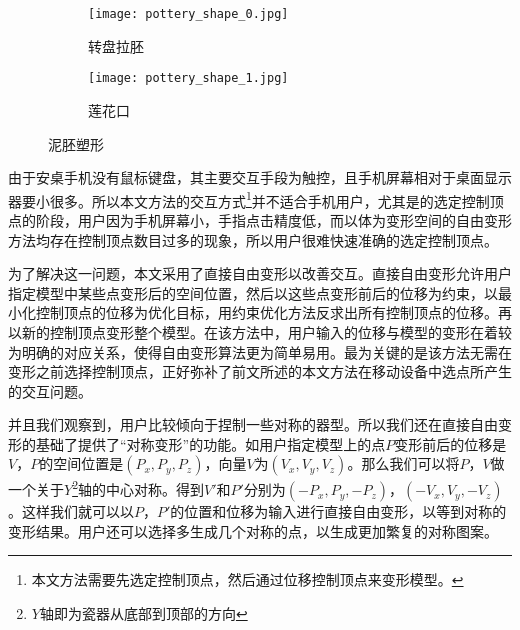 \begin{figure}[htbp]
	\centering
	\begin{subfigure}[b]{.4\textwidth}
		\centering
		\texttt{[image: pottery\_shape\_0.jpg]}
		\caption{转盘拉胚}\label{subfig:pottery_shape_0}
	\end{subfigure}
	\begin{subfigure}[b]{.4\textwidth}
		\centering
		\texttt{[image: pottery\_shape\_1.jpg]}
		\caption{莲花口}\label{subfig:pottery_shape_1}
	\end{subfigure}
	\caption{泥胚塑形}\label{fig:pottery_shape}
\end{figure}

由于安桌手机没有鼠标键盘，其主要交互手段为触控，且手机屏幕相对于桌面显示器要小很多。所以本文方法的交互方式\footnote{本文方法需要先选定控制顶点，然后通过位移控制顶点来变形模型。}并不适合手机用户，尤其是的选定控制顶点的阶段，用户因为手机屏幕小，手指点击精度低，而以体为变形空间的自由变形方法均存在控制顶点数目过多的现象，所以用户很难快速准确的选定控制顶点。

为了解决这一问题，本文采用了直接自由变形\cite{hsu1992}以改善交互。直接自由变形允许用户指定模型中某些点变形后的空间位置，然后以这些点变形前后的位移为约束，以最小化控制顶点的位移为优化目标，用约束优化方法反求出所有控制顶点的位移。再以新的控制顶点变形整个模型。在该方法中，用户输入的位移与模型的变形在着较为明确的对应关系，使得自由变形算法更为简单易用。最为关键的是该方法无需在变形之前选择控制顶点，正好弥补了前文所述的本文方法在移动设备中选点所产生的交互问题。

并且我们观察到，用户比较倾向于捏制一些对称的器型。所以我们还在直接自由变形的基础了提供了“对称变形”的功能。如用户指定模型上的点$P$变形前后的位移是$V$，$P$的空间位置是$(P_x, P_y, P_z)$，向量$V$为$(V_x, V_y, V_z)$。那么我们可以将$P$，$V$做一个关于$Y$\footnote{$Y$轴即为瓷器从底部到顶部的方向}轴的中心对称。得到$V'$和$P'$分别为$(-P_x, P_y, -P_z)$，$(-V_x, V_y, -V_z)$。这样我们就可以以$P$，$P'$的位置和位移为输入进行直接自由变形，以等到对称的变形结果。用户还可以选择多生成几个对称的点，以生成更加繁复的对称图案。
